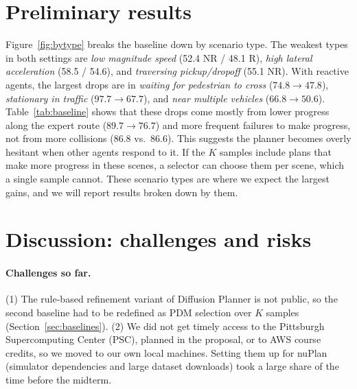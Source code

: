 \documentclass{article}
\begin{document}
\section{Preliminary results}

Figure~\ref{fig:bytype} breaks the baseline down by scenario type. The weakest types in both settings are \emph{low magnitude speed} (52.4 NR / 48.1 R), \emph{high lateral acceleration} (58.5 / 54.6), and \emph{traversing pickup/dropoff} (55.1 NR). With reactive agents, the largest drops are in \emph{waiting for pedestrian to cross} ($74.8\rightarrow47.8$), \emph{stationary in traffic} ($97.7\rightarrow67.7$), and \emph{near multiple vehicles} ($66.8\rightarrow50.6$). Table~\ref{tab:baseline} shows that these drops come mostly from lower progress along the expert route ($89.7\rightarrow76.7$) and more frequent failures to make progress, not from more collisions (86.8 vs.\ 86.6). This suggests the planner becomes overly hesitant when other agents respond to it. If the $K$ samples include plans that make more progress in these scenes, a selector can choose them per scene, which a single sample cannot. These scenario types are where we expect the largest gains, and we will report results broken down by them.

\section{Discussion: challenges and risks}

\paragraph{Challenges so far.}
(1) The rule-based refinement variant of Diffusion Planner is not public, so the second baseline had to be redefined as PDM selection over $K$ samples (Section~\ref{sec:baselines}).
(2) We did not get timely access to the Pittsburgh Supercomputing Center (PSC), planned in the proposal, or to AWS course credits, so we moved to our own local machines. Setting them up for nuPlan (simulator dependencies and large dataset downloads) took a large share of the time before the midterm.
\end{document}
